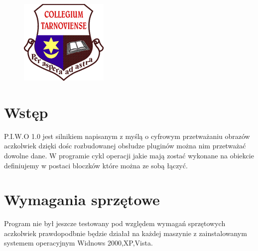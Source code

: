 \documentclass[a4paper,10pt]{article}
\title{\textbf{\begin{LARGE}P.I.W.O. 1.0\end{LARGE}}\\\underline{Projekt Informatyczny} \\ Wilqu \& Others \\\textbf{Instrukcja użytkownika}}
\author{Piotr Wilk \and Piotr Zegar \and Mateusz Tylek \and Mateusz Kocąb \and Wojciech Zbiegieł \and Sławomir Librant \and  Marek Prząda}
\begin{document}
\maketitle
\begin{figure}[h]
 \centering
\includegraphics{logo}
\begin{center}
\begin{center}

\end{center}

\end{center}

\end{figure}
\newpage
\tableofcontents
\newpage

\section{Wstęp}
P.I.W.O 1.0 jest silnikiem napisanym z myślą o cyfrowym przetważaniu obrazów aczkolwiek dzięki dośc rozbudowanej obsłudze pluginów można nim przetważać dowolne dane. W programie cykl operacji jakie mają zostać wykonane na obiekcie definiujemy w postaci bloczków które można ze sobą łączyć.
\section{Wymagania sprzętowe}
Program nie był jeszcze testowany pod względem wymagań sprzętowych aczkolwiek prawdopodbnie będzie działał na każdej maszynie z
zainstalowanym systemem operacyjnym Widnows 2000,XP,Vista.
\end{document}
